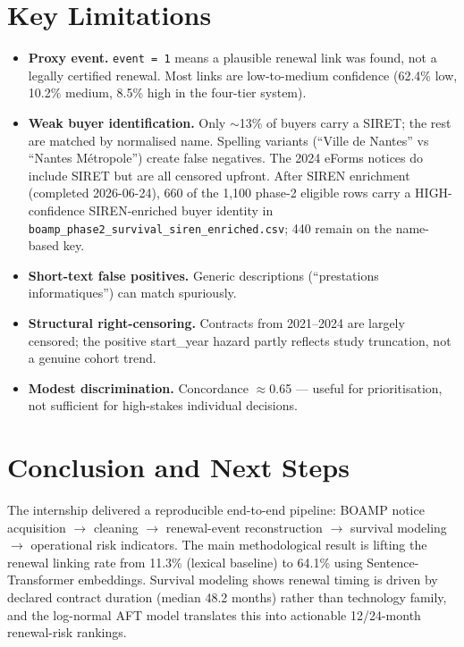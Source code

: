 \documentclass[11pt,a4paper]{article}
\begin{document}
\section{Key Limitations}

\begin{itemize}[leftmargin=1.4em,itemsep=2pt]
  \item \textbf{Proxy event.} \texttt{event = 1} means a plausible renewal link
        was found, not a legally certified renewal. Most links are low-to-medium
        confidence (62.4\% low, 10.2\% medium, 8.5\% high in the four-tier system).
  \item \textbf{Weak buyer identification.} Only $\sim$13\% of buyers carry a
        SIRET; the rest are matched by normalised name. Spelling variants
        (``Ville de Nantes'' vs ``Nantes M\'etropole'') create false negatives.
        The 2024 eForms notices do include SIRET but are all censored upfront.
        After SIREN enrichment (completed 2026-06-24), 660 of the 1,100
        phase-2 eligible rows carry a HIGH-confidence SIREN-enriched buyer
        identity in \nolinkurl{boamp_phase2_survival_siren_enriched.csv};
        440 remain on the name-based key.
  \item \textbf{Short-text false positives.} Generic descriptions
        (``prestations informatiques'') can match spuriously.
  \item \textbf{Structural right-censoring.} Contracts from 2021--2024 are
        largely censored; the positive start\_year hazard partly reflects study
        truncation, not a genuine cohort trend.
  \item \textbf{Modest discrimination.} Concordance $\approx$0.65 --- useful
        for prioritisation, not sufficient for high-stakes individual decisions.
\end{itemize}

\section{Conclusion and Next Steps}

The internship delivered a reproducible end-to-end pipeline: BOAMP notice
acquisition $\to$ cleaning $\to$ renewal-event reconstruction $\to$ survival
modeling $\to$ operational risk indicators. The main methodological result is
lifting the renewal linking rate from 11.3\% (lexical baseline) to 64.1\%
using Sentence-Transformer embeddings. Survival modeling shows renewal timing is
driven by declared contract duration (median 48.2 months) rather than
technology family, and the log-normal AFT model translates this into
actionable 12/24-month renewal-risk rankings.
\end{document}
